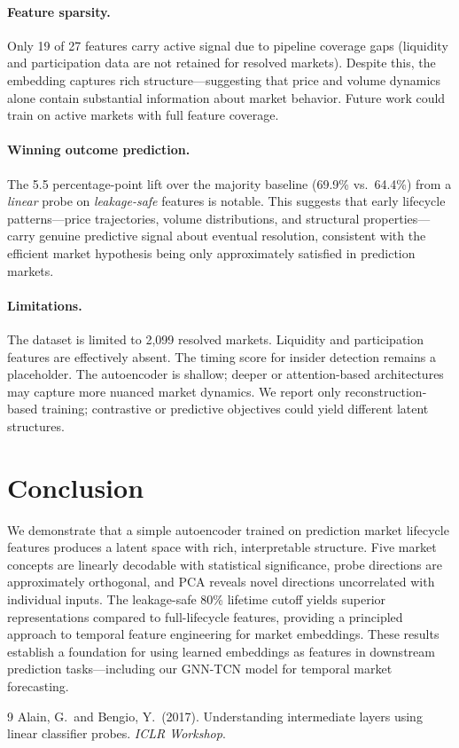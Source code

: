\documentclass[11pt,a4paper]{article}
\begin{document}
\paragraph{Feature sparsity.} Only 19 of 27 features carry active signal due to pipeline coverage gaps (liquidity and participation data are not retained for resolved markets). Despite this, the embedding captures rich structure---suggesting that price and volume dynamics alone contain substantial information about market behavior. Future work could train on active markets with full feature coverage.

\paragraph{Winning outcome prediction.} The 5.5 percentage-point lift over the majority baseline (69.9\% vs.\ 64.4\%) from a \emph{linear} probe on \emph{leakage-safe} features is notable. This suggests that early lifecycle patterns---price trajectories, volume distributions, and structural properties---carry genuine predictive signal about eventual resolution, consistent with the efficient market hypothesis being only approximately satisfied in prediction markets.

\paragraph{Limitations.} The dataset is limited to 2,099 resolved markets. Liquidity and participation features are effectively absent. The timing score for insider detection remains a placeholder. The autoencoder is shallow; deeper or attention-based architectures may capture more nuanced market dynamics. We report only reconstruction-based training; contrastive or predictive objectives could yield different latent structures.

\section{Conclusion}

We demonstrate that a simple autoencoder trained on prediction market lifecycle features produces a latent space with rich, interpretable structure. Five market concepts are linearly decodable with statistical significance, probe directions are approximately orthogonal, and PCA reveals novel directions uncorrelated with individual inputs. The leakage-safe 80\% lifetime cutoff yields superior representations compared to full-lifecycle features, providing a principled approach to temporal feature engineering for market embeddings. These results establish a foundation for using learned embeddings as features in downstream prediction tasks---including our GNN-TCN model for temporal market forecasting.

\begin{thebibliography}{9}
 Alain, G.\ and Bengio, Y.\ (2017). Understanding intermediate layers using linear classifier probes. \textit{ICLR Workshop}.
\end{thebibliography}
\end{document}
